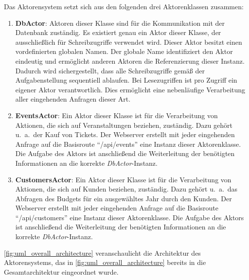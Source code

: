 Das Aktorensystem setzt sich aus den folgenden drei Aktorenklassen zusammen:
\begin{enumerate}
    \item \textbf{DbActor}: Aktoren dieser Klasse sind für die Kommunikation mit der Datenbank zuständig.
    Es existiert genau ein Aktor dieser Klasse, der ausschließlich für Schreibzugriffe verwendet wird.
    Dieser Aktor besitzt einen vordefinierten globalen Namen.
    Der globale Name identifiziert den Aktor eindeutig und ermöglicht anderen Aktoren die Referenzierung dieser Instanz.
    Dadurch wird sichergestellt, dass alle Schreibzugriffe gemäß der Aufgabenstellung sequentiell ablaufen.
    Bei Lesezugriffen ist pro Zugriff ein eigener Aktor verantwortlich.
    Dies ermöglicht eine nebenläufige Verarbeitung aller eingehenden Anfragen dieser Art.
    \item \textbf{EventsActor}: Ein Aktor dieser Klasse ist für die Verarbeitung von Aktionen, die sich auf Veranstaltungen beziehen, zuständig.
    Dazu gehört u.\ a.\ der Kauf von Tickets.
    Der Webserver erstellt mit jeder eingehenden Anfrage auf die Basisroute \enquote{/api/events} eine Instanz dieser Aktorenklasse. 
    Die Aufgabe des Aktors ist anschließend die Weiterleitung der benötigten Informationen an die korrekte \textit{DbActor}-Instanz.
    \item \textbf{CustomersActor}: Ein Aktor dieser Klasse ist für die Verarbeitung von Aktionen, die sich auf Kunden beziehen, zuständig.
    Dazu gehört u.\ a.\ das Abfragen des Budgets für ein ausgewähltes Jahr durch den Kunden.
    Der Webserver erstellt mit jeder eingehenden Anfrage auf die Basisroute \enquote{/api/customers} eine Instanz dieser Aktorenklasse. 
    Die Aufgabe des Aktors ist anschließend die Weiterleitung der benötigten Informationen an die korrekte \textit{DbActor}-Instanz.
\end{enumerate}

\autoref{fig:uml_overall_architecture} veranschaulicht die Architektur des Aktorensystems, das in \autoref{fig:uml_overall_architecture} bereits in die Gesamtarchitektur eingeordnet wurde.

